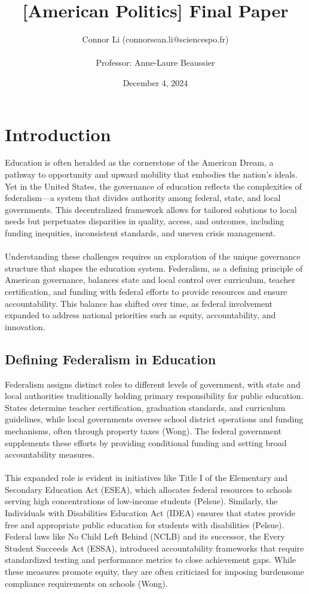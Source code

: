 \documentclass[11pt]{extarticle}
\title{[American Politics] Final Paper}
\author{Connor Li (connorsean.li$@$sciencespo.fr)\\
\\
Professor: Anne-Laure Beaussier}
\date{December 4, 2024}
\begin{document}
\maketitle

\tableofcontents



\pagebreak

\section{Introduction}
Education is often heralded as the cornerstone of the American Dream, a pathway to opportunity and upward mobility that embodies the nation’s ideals. Yet in the United States, the governance of education reflects the complexities of federalism—a system that divides authority among federal, state, and local governments. This decentralized framework allows for tailored solutions to local needs but perpetuates disparities in quality, access, and outcomes, including funding inequities, inconsistent standards, and uneven crisis management.\\
\\
Understanding these challenges requires an exploration of the unique governance structure that shapes the education system. Federalism, as a defining principle of American governance, balances state and local control over curriculum, teacher certification, and funding with federal efforts to provide resources and ensure accountability. This balance has shifted over time, as federal involvement expanded to address national priorities such as equity, accountability, and innovation.

\subsection{Defining Federalism in Education}
Federalism assigns distinct roles to different levels of government, with state and local authorities traditionally holding primary responsibility for public education. States determine teacher certification, graduation standards, and curriculum guidelines, while local governments oversee school district operations and funding mechanisms, often through property taxes (Wong). The federal government supplements these efforts by providing conditional funding and setting broad accountability measures.\\
\\
This expanded role is evident in initiatives like Title I of the Elementary and Secondary Education Act (ESEA), which allocates federal resources to schools serving high concentrations of low-income students (Pelsue). Similarly, the Individuals with Disabilities Education Act (IDEA) ensures that states provide free and appropriate public education for students with disabilities (Pelsue). Federal laws like No Child Left Behind (NCLB) and its successor, the Every Student Succeeds Act (ESSA), introduced accountability frameworks that require standardized testing and performance metrics to close achievement gaps. While these measures promote equity, they are often criticized for imposing burdensome compliance requirements on schools (Wong).
\end{document}

